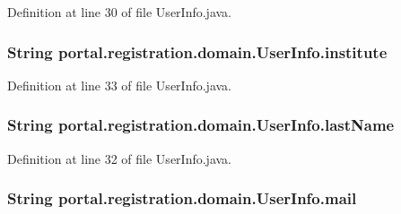 Definition at line 30 of file UserInfo.java.

\hypertarget{classportal_1_1registration_1_1domain_1_1UserInfo_a71b2ba532eff8a9fb4fac4c000b3a8f3}{
\subsubsection[{institute}]{\setlength{\rightskip}{0pt plus 5cm}String {\bf portal.registration.domain.UserInfo.institute}}}
\label{classportal_1_1registration_1_1domain_1_1UserInfo_a71b2ba532eff8a9fb4fac4c000b3a8f3}


Definition at line 33 of file UserInfo.java.

\hypertarget{classportal_1_1registration_1_1domain_1_1UserInfo_a294fb84a68dad74ae5ed4e2186f5e460}{
\subsubsection[{lastName}]{\setlength{\rightskip}{0pt plus 5cm}String {\bf portal.registration.domain.UserInfo.lastName}}}
\label{classportal_1_1registration_1_1domain_1_1UserInfo_a294fb84a68dad74ae5ed4e2186f5e460}


Definition at line 32 of file UserInfo.java.

\hypertarget{classportal_1_1registration_1_1domain_1_1UserInfo_a0433a86cea33aac5e724356012617157}{
\subsubsection[{mail}]{\setlength{\rightskip}{0pt plus 5cm}String {\bf portal.registration.domain.UserInfo.mail}}}
\label{classportal_1_1registration_1_1domain_1_1UserInfo_a0433a86cea33aac5e724356012617157}


